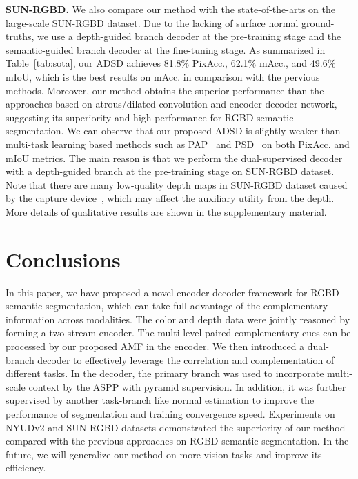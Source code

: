 \documentclass[10pt,twocolumn,letterpaper]{article}
\begin{document}
\noindent
\textbf{SUN-RGBD.}
We also compare our method with the state-of-the-arts on the large-scale SUN-RGBD dataset. Due to the lacking of surface normal ground-truths, we use a depth-guided branch decoder at the pre-training stage and the semantic-guided branch decoder at the fine-tuning stage. As summarized in Table~\ref{tab:sota}, our ADSD achieves 81.8\% PixAcc., 62.1\% mAcc., and 49.6\% mIoU, which is the best results on mAcc. in comparison with the pervious methods. Moreover, our method obtains the superior performance than the approaches based on atrous/dilated convolution and encoder-decoder network, suggesting its superiority and high performance for RGBD semantic segmentation. We can observe that our proposed ADSD is slightly weaker than multi-task learning based methods such as PAP~\cite{Zhang:CVPR19} and PSD~\cite{Zhou:CVPR20} on both PixAcc. and mIoU metrics. The main reason is that we perform the dual-supervised decoder with a depth-guided branch at the pre-training stage on SUN-RGBD dataset. Note that there are many low-quality depth maps in SUN-RGBD dataset caused by the capture device~\cite{Song:CVPR15,Lee:ICCV17}, which may affect the auxiliary utility from the depth.
More details of qualitative results are shown in the supplementary material. 

\section{Conclusions}\label{sec:conclusions}
In this paper, we have proposed a novel encoder-decoder framework for RGBD semantic segmentation, which can take full advantage of the complementary information across modalities. The color and depth data were jointly reasoned by forming a two-stream encoder. The multi-level paired complementary cues can be processed by our proposed AMF in the encoder. We then introduced a dual-branch decoder to effectively leverage the correlation and complementation of different tasks. In the decoder, the primary branch was used to incorporate multi-scale context by the ASPP with pyramid supervision. In addition, it was further supervised by another task-branch like normal estimation to improve the performance of segmentation and training convergence speed. Experiments on NYUDv2 and SUN-RGBD datasets demonstrated the superiority of our method compared with the previous approaches on RGBD semantic segmentation. In the future, we will generalize our method on more vision tasks and improve its efficiency.




{\small


}
\end{document}
